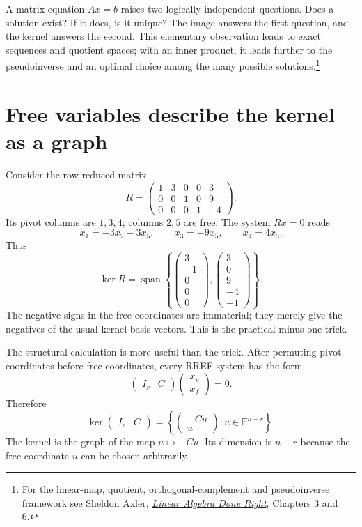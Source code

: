 
A matrix equation \(Ax=b\) raises two logically independent questions. Does a solution exist? If it does, is it unique? The image answers the first question, and the kernel answers the second. This elementary observation leads to exact sequences and quotient spaces; with an inner product, it leads further to the pseudoinverse and an optimal choice among the many possible solutions.\footnote{For the linear-map, quotient, orthogonal-complement and pseudoinverse framework see Sheldon Axler, \href{https://linear.axler.net/}{\emph{Linear Algebra Done Right}}, Chapters 3 and 6.}

\section{Free variables describe the kernel as a graph}

Consider the row-reduced matrix
\[
 R=
 \begin{pmatrix}
 1&3&0&0&3\\
 0&0&1&0&9\\
 0&0&0&1&-4
 \end{pmatrix}.
\]
Its pivot columns are \(1,3,4\); columns \(2,5\) are free. The system \(Rx=0\) reads
\[
 x_1=-3x_2-3x_5,\qquad
 x_3=-9x_5,\qquad x_4=4x_5.
\]
Thus
\[
 \boxed{\ker R
 =\operatorname{span}\left\{
 \begin{pmatrix}3\\-1\\0\\0\\0\end{pmatrix},
 \begin{pmatrix}3\\0\\9\\-4\\-1\end{pmatrix}
 \right\}.}
\]
The negative signs in the free coordinates are immaterial; they merely give the negatives of the usual kernel basis vectors. This is the practical minus-one trick.

The structural calculation is more useful than the trick. After permuting pivot coordinates before free coordinates, every RREF system has the form
\[
 \begin{pmatrix}I_r&C\end{pmatrix}
 \begin{pmatrix}x_p\\x_f\end{pmatrix}=0.
\]
Therefore
\[
 \boxed{\ker\begin{pmatrix}I_r&C\end{pmatrix}
 =\left\{\begin{pmatrix}-Cu\\u\end{pmatrix}:
       u\in\mathbb F^{n-r}\right\}.}
\]
The kernel is the graph of the map \(u\mapsto-Cu\). Its dimension is \(n-r\) because the free coordinate \(u\) can be chosen arbitrarily.

